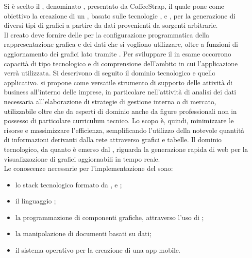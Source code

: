 		Si è scelto il , denominato \projectname, presentato da CoffeeStrap, il quale pone come obiettivo la creazione di un , basato sulle tecnologie ,  e , per la generazione di diversi tipi di grafici a partire da dati provenienti da sorgenti arbitrarie.\\
		Il  creato deve fornire delle  per la configurazione programmatica della rappresentazione grafica e dei dati che si vogliono utilizzare, oltre a funzioni di aggiornamento dei grafici lato  tramite .
		Per sviluppare il  in esame occorrono capacità di tipo tecnologico e di comprensione dell'ambito in cui l'applicazione verrà utilizzata. Si descrivono di seguito il dominio tecnologico e quello applicativo.
			\projectname{} si propone come versatile strumento di supporto delle attività di business all'interno delle imprese, in particolare nell'attività di analisi dei dati necessaria all'elaborazione di strategie di gestione interna o di mercato, utilizzabile oltre che da esperti di dominio anche da figure professionali non in possesso di particolare curriculum tecnico. Lo scopo è, quindi, minimizzare le risorse e massimizzare l'efficienza, semplificando l'utilizzo della notevole quantità di informazioni derivanti dalla rete attraverso grafici e tabelle.
			Il dominio tecnologico, da quanto è emerso dal , riguarda la generazione rapida di  web per la visualizzazione di grafici aggiornabili in tempo reale.\\
			Le conoscenze necessarie per l'implementazione del  sono:
			\begin{itemize}
				\item lo stack tecnologico formato da ,  e ;
				\item il linguaggio ;
				\item la programmazione di componenti grafiche, attraverso l'uso di ;
				\item la manipolazione di documenti basati su dati;
				\item il sistema operativo  per la creazione di una app mobile.
			\end{itemize}
